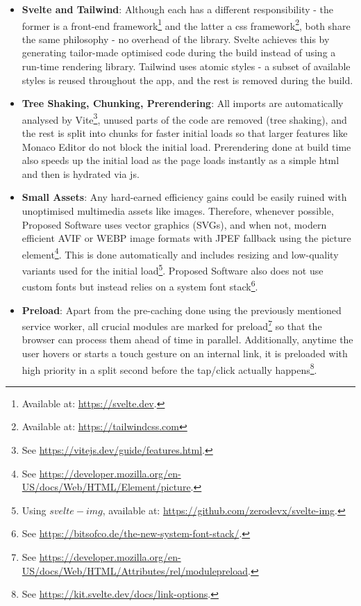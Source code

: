 \begin{itemize}
    \item \textbf{Svelte and Tailwind}: Although each has a different responsibility - the former is a front-end framework\footnote{Available at: \url{https://svelte.dev}.} and the latter a \gls{css} framework\footnote{Available at: \url{https://tailwindcss.com}}, both share the same philosophy - no overhead of the library. Svelte achieves this by generating tailor-made optimised code during the build instead of using a run-time rendering library. Tailwind uses atomic styles - a subset of available styles is reused throughout the app, and the rest is removed during the build.
    \item \textbf{Tree Shaking, Chunking, Prerendering}: All imports are automatically analysed by Vite\footnote{See \url{https://vitejs.dev/guide/features.html}.}, unused parts of the code are removed (tree shaking), and the rest is split into chunks for faster initial loads so that larger features like Monaco Editor do not block the initial load. Prerendering done at build time also speeds up the initial load as the page loads instantly as a simple \gls{html} and then is hydrated via \gls{js}.
    \item \textbf{Small Assets}: Any hard-earned efficiency gains could be easily ruined with unoptimised multimedia assets like images. Therefore, whenever possible, Proposed Software uses vector graphics (SVGs), and when not, modern efficient AVIF or WEBP image formats with JPEF fallback using the picture element\footnote{See \url{https://developer.mozilla.org/en-US/docs/Web/HTML/Element/picture}.}. This is done automatically and includes resizing and low-quality variants used for the initial load\footnote{Using $svelte-img$, available at: \url{https://github.com/zerodevx/svelte-img}.}. Proposed Software also does not use custom fonts but instead relies on a system font stack\footnote{See \url{https://bitsofco.de/the-new-system-font-stack/}.}.
    \item \textbf{Preload}: Apart from the pre-caching done using the previously mentioned service worker, all crucial modules are marked for preload\footnote{See \url{https://developer.mozilla.org/en-US/docs/Web/HTML/Attributes/rel/modulepreload}.} so that the browser can process them ahead of time in parallel. Additionally, anytime the user hovers or starts a touch gesture on an internal link, it is preloaded with high priority in a split second before the tap/click actually happens\footnote{See \url{https://kit.svelte.dev/docs/link-options}.}.
\end{itemize}

